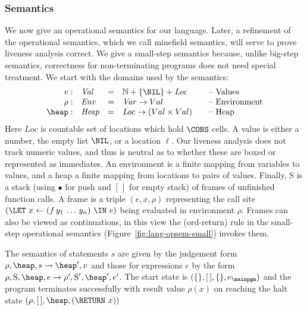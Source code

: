 \documentclass{llncs}
\newcommand{\stk}{\mbox{S}}       %
\begin{document}
\subsubsection{Semantics}
We now give an operational
semantics for  our language.  Later, a refinement of
the  operational semantics,  which we  call minefield  semantics, will
serve to prove liveness analysis correct.
We give a small-step semantics because, unlike big-step semantics,
correctness for non-terminating programs does not need special treatment.
We start with the domains used by the semantics:
\[
\begin{array}{rlcl@{\hspace{2em}}l}
v:   & \mathit{Val} &=& \mathbb{N} + \{\NIL\} + \mathit{Loc}& \mbox{-- Values}\\
\rho: & \mathit{Env} &=&\mathit{Var} \rightarrow {Val} &
\mbox{-- Environment} \\ 
\heap: & \mathit{Heap} & =&\mathit{Loc} \rightarrow ({Val\times
  Val}) & \mbox{-- Heap}
\end{array}
\]
Here $\mathit{Loc}$ is countable set of locations which hold $\CONS$ cells.
A value is either a number, the empty list $\NIL$, or a location  $\ell$.
Our liveness analysis does not track numeric values, and thus is neutral
as to whether these are boxed or represented as immediates.
An environment is a finite mapping from variables to values, and a heap a finite mapping
from locations to pairs of values.
Finally, $\stk$ is a stack
(using $\bullet$ for push and $[\,]$ for empty stack)
of frames of unfinished function calls.  A
frame is a triple $(e,x,\rho)$ representing the call site
$
(\LET\,\, x \leftarrow (f\,y_1\,\ldots\,y_n) \,\, \IN\,\, e)
$
being evaluated in environment $\rho$.
Frames can also be viewed as continuations, in this view
the ({\sc ord-return}) 
 rule in the small-step operational semantics (Figure~\ref{fig:lang-opsem-small}) invokes them.

The semantics 
of statements $s$ are given by the judgement form
$\rho, \heap, s \rightsquigarrow \heap', v$
and those for expressions $e$ by the form
$\rho, \stk, \heap, e \rightarrow \rho', \stk', \heap', e'$.
The start state is $(\{\},[\,], \{\}, e_\mainpgm)$ and the
program terminates successfully with result value $\rho(x)$
on reaching the halt state $(\rho,[\,], \heap, (\RETURN\ x))$
\end{document}
